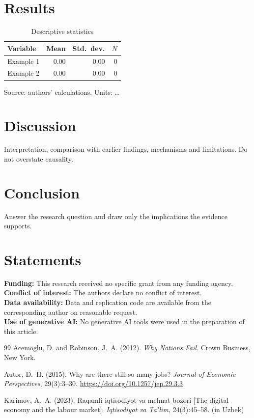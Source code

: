 \documentclass[12pt,a4paper]{article}
\begin{document}
\section{Results}

\begin{table}[htbp]
  \centering
  \caption{Descriptive statistics}
  \label{tab:descriptives}
  \begin{tabular}{lrrr}
    \toprule
    Variable & Mean & Std.\ dev. & $N$ \\
    \midrule
    Example 1 & 0.00 & 0.00 & 0 \\
    Example 2 & 0.00 & 0.00 & 0 \\
    \bottomrule
  \end{tabular}

  \smallskip
  \footnotesize Source: authors' calculations. Units: \dots
\end{table}

\section{Discussion}
Interpretation, comparison with earlier findings, mechanisms and
limitations. Do not overstate causality.

\section{Conclusion}
Answer the research question and draw only the implications the evidence
supports.

\section*{Statements}
\noindent\textbf{Funding:} This research received no specific grant from any
funding agency.\\
\textbf{Conflict of interest:} The authors declare no conflict of interest.\\
\textbf{Data availability:} Data and replication code are available from the
corresponding author on reasonable request.\\
\textbf{Use of generative AI:} No generative AI tools were used in the
preparation of this article.

\begin{thebibliography}{99}
Acemoglu, D. and Robinson, J.~A. (2012).
\newblock \emph{Why Nations Fail}. Crown Business, New York.

Autor, D.~H. (2015).
\newblock Why are there still so many jobs?
\newblock \emph{Journal of Economic Perspectives}, 29(3):3--30.
\newblock \url{https://doi.org/10.1257/jep.29.3.3}

Karimov, A.~A. (2023).
\newblock Raqamli iqtisodiyot va mehnat bozori [The digital economy and the
labour market].
\newblock \emph{Iqtisodiyot va Taʼlim}, 24(3):45--58. (in Uzbek)
\end{thebibliography}
\end{document}
